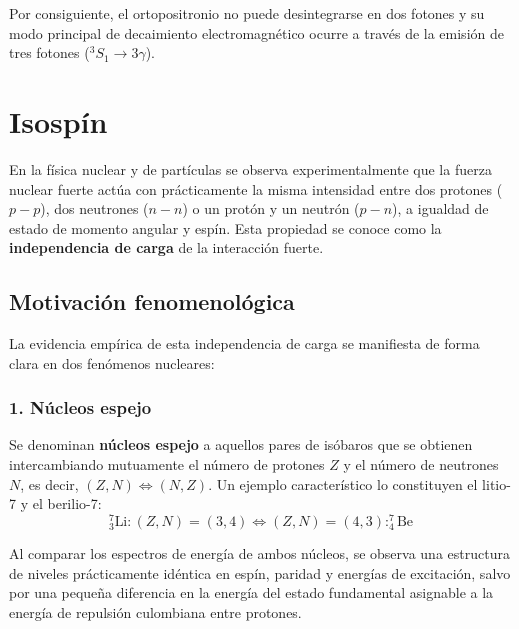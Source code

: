 Por consiguiente, el ortopositronio no puede desintegrarse en dos fotones y su modo principal de decaimiento electromagnético ocurre a través de la emisión de tres fotones ($^3S_1 \to 3\gamma$).

\newpage
\section{Isospín}

En la física nuclear y de partículas se observa experimentalmente que la fuerza nuclear fuerte actúa con prácticamente la misma intensidad entre dos protones ($p-p$), dos neutrones ($n-n$) o un protón y un neutrón ($p-n$), a igualdad de estado de momento angular y espín. Esta propiedad se conoce como la \textbf{independencia de carga} de la interacción fuerte.

\subsection{Motivación fenomenológica}

La evidencia empírica de esta independencia de carga se manifiesta de forma clara en dos fenómenos nucleares:

\subsubsection*{1. Núcleos espejo}
Se denominan \textbf{núcleos espejo} a aquellos pares de isóbaros que se obtienen intercambiando mutuamente el número de protones $Z$ y el número de neutrones $N$, es decir, $(Z, N) \iff (N, Z)$. Un ejemplo característico lo constituyen el litio-7 y el berilio-7:
\begin{equation}
    ^{7}_{3}\text{Li}: (Z, N) = (3, 4) \iff (Z, N) = (4, 3) : ^{7}_{4}\text{Be}
\end{equation}

Al comparar los espectros de energía de ambos núcleos, se observa una estructura de niveles prácticamente idéntica en espín, paridad y energías de excitación, salvo por una pequeña diferencia en la energía del estado fundamental asignable a la energía de repulsión culombiana entre protones.

